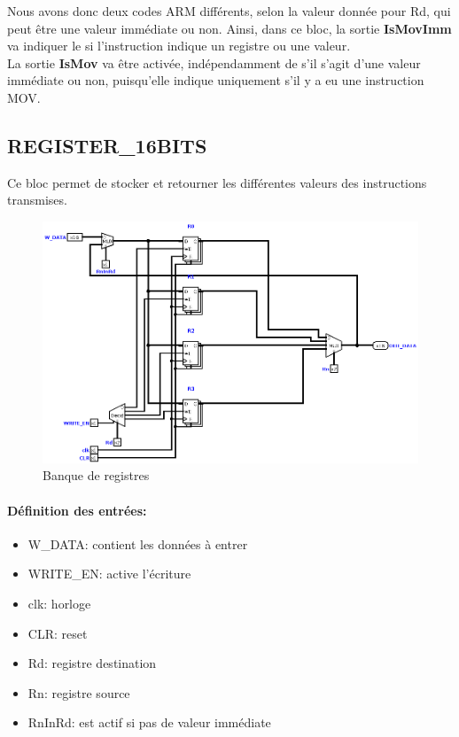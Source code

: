 \documentclass[a4paper]{article} %
\begin{document}
\medskip
Nous avons donc deux codes ARM différents, selon la valeur donnée pour Rd, qui peut être une valeur immédiate ou non. Ainsi, dans ce bloc, la sortie \textbf{IsMovImm} va indiquer le si l'instruction indique un registre ou une valeur. 
\\La sortie \textbf{IsMov} va être activée, indépendamment de s'il s'agit d'une valeur immédiate ou non, puisqu'elle indique uniquement s'il y a eu une instruction MOV.



    
\subsection{REGISTER\_16BITS} \label{regi16}
Ce bloc permet de stocker et retourner les différentes valeurs des instructions transmises.

\begin{figure}[H]
    \centering
    \includegraphics[width=.8\textwidth]{src/REGISTERS_16BITS.png}
    \caption{Banque de registres}
    \label{regi16_img}
\end{figure}



\paragraph{Définition des entrées:}
\begin{itemize}
    \item     W\_DATA: contient les données à entrer
    \item     WRITE\_EN: active l'écriture
    \item     clk: horloge
    \item     CLR: reset
    \item     Rd: registre destination
    \item     Rn: registre source
    \item     RnInRd: est actif si pas de valeur immédiate
\end{itemize}
\end{document}
